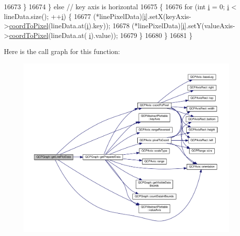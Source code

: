 \begin{DoxyCode}
16673     \}
16674   \} \textcolor{keywordflow}{else} \textcolor{comment}{// key axis is horizontal}
16675   \{
16676     \textcolor{keywordflow}{for} (\textcolor{keywordtype}{int} \hyperlink{_comparision_pictures_2_createtest_image_8m_a6f6ccfcf58b31cb6412107d9d5281426}{i} = 0; \hyperlink{_comparision_pictures_2_createtest_image_8m_a6f6ccfcf58b31cb6412107d9d5281426}{i} < lineData.size(); ++\hyperlink{_comparision_pictures_2_createtest_image_8m_a6f6ccfcf58b31cb6412107d9d5281426}{i}) \{
16677       (*linePixelData)[\hyperlink{_comparision_pictures_2_createtest_image_8m_a6f6ccfcf58b31cb6412107d9d5281426}{i}].setX(keyAxis->\hyperlink{class_q_c_p_axis_a985ae693b842fb0422b4390fe36d299a}{coordToPixel}(lineData.at(\hyperlink{_comparision_pictures_2_createtest_image_8m_a6f6ccfcf58b31cb6412107d9d5281426}{i}).key));
16678       (*linePixelData)[\hyperlink{_comparision_pictures_2_createtest_image_8m_a6f6ccfcf58b31cb6412107d9d5281426}{i}].setY(valueAxis->\hyperlink{class_q_c_p_axis_a985ae693b842fb0422b4390fe36d299a}{coordToPixel}(lineData.at(
      \hyperlink{_comparision_pictures_2_createtest_image_8m_a6f6ccfcf58b31cb6412107d9d5281426}{i}).value));
16679     \}
16680   \}
16681 \}
\end{DoxyCode}


Here is the call graph for this function\+:\nopagebreak
\begin{figure}[H]
\begin{center}
\leavevmode
\includegraphics[width=350pt]{class_q_c_p_graph_ae3d82ffd0c9a883482aabf47b0e6b5ee_cgraph}
\end{center}
\end{figure}




